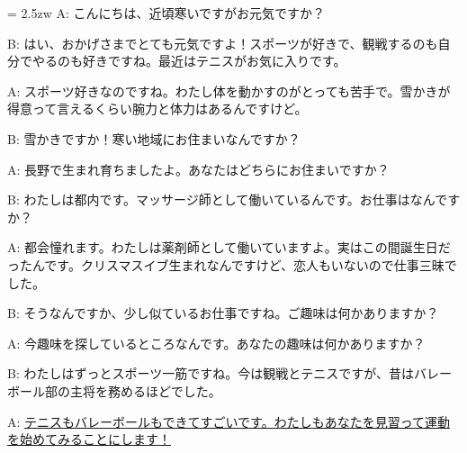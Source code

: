 \documentclass[11pt]{amsart}
\title{}
\author{}
\newenvironment{hangall}[1]{\hangindent = 2.5zw\everypar{\hangindent = 2.5zw}}{}
\begin{document}
\maketitle
\begin{hangall}{}%
A: こんにちは、近頃寒いですがお元気ですか？

B: はい、おかげさまでとても元気ですよ！スポーツが好きで、観戦するのも自分でやるのも好きですね。最近はテニスがお気に入りです。

A: スポーツ好きなのですね。わたし体を動かすのがとっても苦手で。雪かきが得意って言えるくらい腕力と体力はあるんですけど。

B: 雪かきですか！寒い地域にお住まいなんですか？

A: 長野で生まれ育ちましたよ。あなたはどちらにお住まいですか？

B: わたしは都内です。マッサージ師として働いているんです。お仕事はなんですか？

A: 都会憧れます。わたしは薬剤師として働いていますよ。実はこの間誕生日だったんです。クリスマスイブ生まれなんですけど、恋人もいないので仕事三昧でした。

B: そうなんですか、少し似ているお仕事ですね。ご趣味は何かありますか？

A: 今趣味を探しているところなんです。あなたの趣味は何かありますか？

B: わたしはずっとスポーツ一筋ですね。今は観戦とテニスですが、昔はバレーボール部の主将を務めるほどでした。

A: \ul{テニスもバレーボールもできてすごいです。わたしもあなたを見習って運動を始めてみることにします！}\end{hangall}
\end{document}
